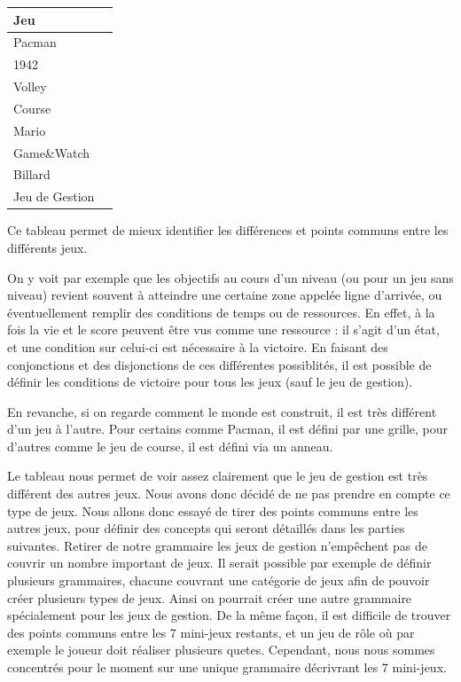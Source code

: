 
\vspace{0.5cm}

\begin{tabular}{|l|l}
\hline
 Jeu &   \\
\hline
 Pacman &  \\
\hline
 1942 &   \\
\hline
 Volley &  \\
\hline
 Course &  \\
\hline
 Mario &  \\
\hline
 Game\&Watch & \\
\hline
 Billard &  \\
\hline
 Jeu de Gestion & \\
\hline
\end{tabular}

\vspace{0.5cm}

Ce tableau permet de mieux identifier les différences et points communs entre les différents jeux.

On y voit par exemple que les objectifs au cours d'un niveau (ou pour un jeu sans niveau) revient souvent à atteindre une certaine zone
appelée ligne d'arrivée, ou éventuellement remplir des conditions de temps ou de ressources. En effet, à la fois la vie et le score
peuvent être vus comme une ressource : il s'agit d'un état, et une condition sur celui-ci est nécessaire à la victoire.
En faisant des conjonctions et des disjonctions de ces différentes possiblités, il est possible de définir 
les conditions de victoire pour tous les jeux (sauf le jeu de gestion).

En revanche, si on regarde comment le monde est construit, il est très différent d'un jeu à l'autre.
Pour certains comme Pacman, il est défini par une grille, pour d'autres comme le jeu de course, il est défini via un anneau.

Le tableau nous permet de voir assez clairement que le jeu de gestion est très différent des autres jeux.
Nous avons donc décidé de ne pas prendre en compte ce type de jeux.
Nous allons donc essayé de tirer des points communs entre les autres jeux, pour définir des concepts qui seront détaillés dans 
les parties suivantes.
Retirer de notre grammaire les jeux de gestion n'empêchent pas de couvrir un nombre important de jeux.
Il serait possible par exemple de définir plusieurs grammaires, chacune couvrant une catégorie de jeux afin de pouvoir
créer plusieurs types de jeux. Ainsi on pourrait créer une autre grammaire spécialement pour les jeux de gestion.
De la même façon, il est difficile de trouver des points communs entre les 7 mini-jeux restants, et un jeu de rôle où par exemple le joueur
doit réaliser plusieurs quetes.
Cependant, nous nous sommes concentrés pour le moment sur une unique grammaire décrivrant les 7 mini-jeux.


